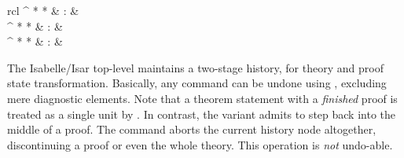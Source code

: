 \begin{isabellebody}
\begin{isamarkuptext}
\begin{description}
  \end{description}%
\end{isamarkuptext}%
\isamarkuptrue%
%
\isamarkuptrue%
%
\begin{isamarkuptext}%
\begin{matharray}{rcl}
    \hypertarget{command.undo}{\hyperlink{command.undo}{\mbox{}}}^{{ * }{ * }} & : &  \\
    \hypertarget{command.linear-undo}{\hyperlink{command.linear-undo}{\mbox{}}}^{{ * }{ * }} & : &  \\
    \hypertarget{command.kill}{\hyperlink{command.kill}{\mbox{}}}^{{ * }{ * }} & : &  \\
  \end{matharray}

  The Isabelle/Isar top-level maintains a two-stage history, for
  theory and proof state transformation.  Basically, any command can
  be undone using \hyperlink{command.undo}{\mbox{}}, excluding mere diagnostic
  elements.  Note that a theorem statement with a \emph{finished}
  proof is treated as a single unit by \hyperlink{command.undo}{\mbox{}}.  In
  contrast, the variant \hyperlink{command.linear-undo}{\mbox{}} admits to step back
  into the middle of a proof.  The \hyperlink{command.kill}{\mbox{}} command aborts
  the current history node altogether, discontinuing a proof or even
  the whole theory.  This operation is \emph{not} undo-able.


\end{isamarkuptext}
\end{isabellebody}
